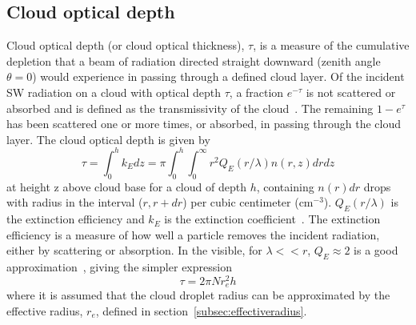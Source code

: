 \subsection{Cloud optical depth}
\label{subsec:cloudoptdep}
Cloud optical depth (or cloud optical thickness), $\tau$, is a measure of the cumulative depletion that a beam of radiation directed straight downward (zenith angle $\theta = 0$) would experience in passing through a defined cloud layer. Of the incident SW radiation on a cloud with optical depth $\tau$, a fraction $e^{-\tau}$ is not scattered or absorbed and is defined as the transmissivity of the cloud~\citep{Wallace2006}. The remaining $1-e^{\tau}$ has been scattered one or more times, or absorbed, in passing through the cloud layer. The cloud optical depth is given by~\citep{Twomey1977}
\begin{equation}
\tau = \int_0^h k_{E}dz = \pi \int_0^h \int_0^{\infty} r^2 Q_E(r/\lambda) n(r,z) dr dz
\end{equation}
at height z above cloud base for a cloud of depth $h$, containing $n(r)dr$ drops with radius in the interval ($r, r + dr$) per cubic centimeter ($\text{cm}^{-3}$). $Q_E(r/\lambda)$ is the extinction efficiency and $k_{E}$ is the extinction coefficient~\citep{Twomey1977}. The extinction efficiency is a measure of how well a particle removes the incident radiation, either by scattering or absorption. In the visible, for $\lambda<<r$, $Q_E\approx 2$ is a good approximation~\citep{Hobbs1993}, giving the simpler expression
\begin{equation}
\tau = 2\pi N r_e^2 h
\label{eqn:cloudtau1}
\end{equation}
where it is assumed that the cloud droplet radius can be approximated by the effective radius, $r_e$, defined in section~\ref{subsec:effectiveradius}.

